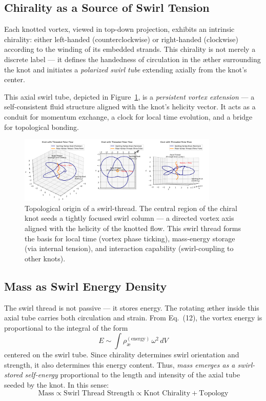 \documentclass[preprint]{revtex4-2}
\begin{document}
    \subsection{Chirality as a Source of Swirl Tension}

    Each knotted vortex, viewed in top-down projection, exhibits an intrinsic chirality: either left-handed (counterclockwise) or right-handed (clockwise) according to the winding of its embedded strands. This chirality is not merely a discrete label — it defines the handedness of circulation in the æther surrounding the knot and initiates a \textit{polarized swirl tube} extending axially from the knot’s center.

    This axial swirl tube, depicted in Figure~\ref{fig:knotthreaded}, is a \textit{persistent vortex extension} — a self-consistent fluid structure aligned with the knot’s helicity vector. It acts as a conduit for momentum exchange, a clock for local time evolution, and a bridge for topological bonding.

    \begin{figure}[H]
        \centering
        \includegraphics[width=0.85\textwidth]{KnotThreadedPolarFlow}
        \caption{Topological origin of a swirl-thread. The central region of the chiral knot seeds a tightly focused swirl column — a directed vortex axis aligned with the helicity of the knotted flow. This swirl thread forms the basis for local time (vortex phase ticking), mass-energy storage (via internal tension), and interaction capability (swirl-coupling to other knots).}
        \label{fig:knotthreaded}
    \end{figure}

    \subsection{Mass as Swirl Energy Density}

    The swirl thread is not passive — it stores energy. The rotating æther inside this axial tube carries both circulation and strain. From Eq.~(12), the vortex energy is proportional to the integral of the form
    \[
        E \sim \int \rho_{\text{\ae}}^{(\text{energy})} \, \omega^2 \, dV
    \]
    centered on the swirl tube. Since chirality determines swirl orientation and strength, it also determines this energy content. Thus, \textit{mass emerges as a swirl-stored self-energy} proportional to the length and intensity of the axial tube seeded by the knot. In this sense:
    \[
        \text{Mass} \propto \text{Swirl Thread Strength} \propto \text{Knot Chirality} + \text{Topology}
    \]
\end{document}
